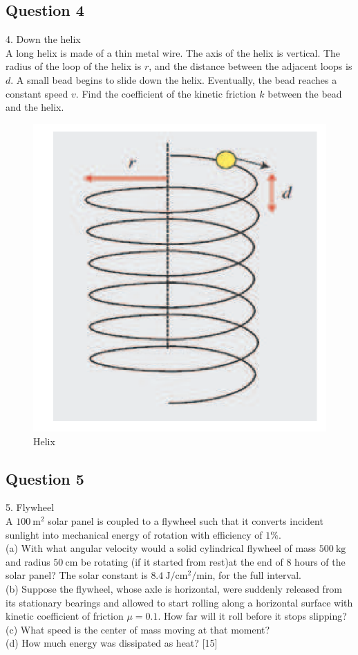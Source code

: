 \documentclass{article}
\begin{document}
\subsection{Question 4}
4. Down the helix \\
A long helix is made of a thin metal wire. The axis of the helix is vertical. The radius of the loop of the helix is $r$, and the distance between the adjacent loops is $d$. A small bead begins to slide down the helix. Eventually, the bead reaches a constant speed $v$. Find the coefficient of the kinetic friction $k$ between the bead and the helix. 

\begin{figure}
	\centering
	\includegraphics[width=0.5\linewidth]{spho_book_TYS_images/2015q4.png}
	\caption{Helix}
\end{figure}

\subsection{Question 5}
5. Flywheel \\
A $100 \mathrm{~m}^{2}$ solar panel is coupled to a flywheel such that it converts incident sunlight into mechanical energy of rotation with efficiency of $1 \%$. \\
(a) With what angular velocity would a solid cylindrical flywheel of mass $500 \mathrm{~kg}$ and radius $50 \mathrm{~cm}$ be rotating (if it started from rest)at the end of 8 hours of the solar panel? The solar constant is $8.4 \mathrm{~J} / \mathrm{cm}^{2} / \mathrm{min}$, for the full interval. \\
(b) Suppose the flywheel, whose axle is horizontal, were suddenly released from its stationary bearings and allowed to start rolling along a horizontal surface with kinetic coefficient of friction $\mu=0.1$. How far will it roll before it stops slipping? \\
(c) What speed is the center of mass moving at that moment? \\
(d) How much energy was dissipated as heat? [15] \\
\end{document}
